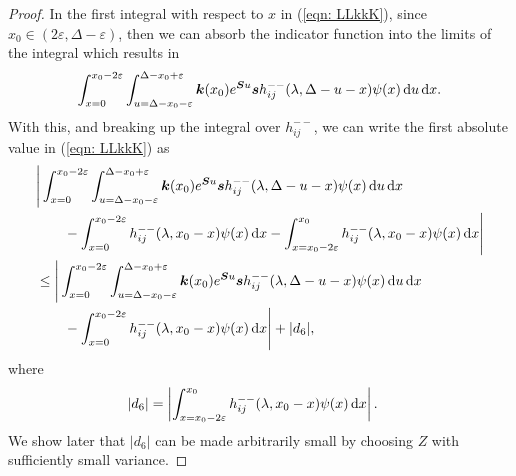 \begin{proof}
	In the first integral with respect to \(x\) in (\ref{eqn: LLkkK}), since \(x_0\in(2\varepsilon,\Delta-\varepsilon)\), then we can absorb the indicator function into the limits of the integral which results in
	\begin{align}
		\int_{x=0}^{x_0-2\varepsilon}\int_{u=\Delta-x_0-\varepsilon}^{\Delta-x_0+\varepsilon} \boldsymbol k(x_0)e^{\boldsymbol Su}\boldsymbol s h_{ij}^{--}(\lambda, \Delta - u - x) \psi(x) \, \mathrm{d} u \, \mathrm{d} x.
	\end{align}
	With this, and breaking up the integral over \(h_{ij}^{--}\), we can write the first absolute value in (\ref{eqn: LLkkK}) as 
	\begin{align}
		\nonumber &\Bigg| \int_{x=0}^{x_0-2\varepsilon}\int_{u=\Delta-x_0-\varepsilon}^{\Delta-x_0+\varepsilon} \boldsymbol k(x_0)e^{\boldsymbol Su}\boldsymbol s h_{ij}^{--}(\lambda, \Delta - u - x) \psi(x) \, \mathrm{d} u  \, \mathrm{d} x 
		\\\nonumber &\qquad{} - \int_{x=0}^{x_0-2\varepsilon} h_{ij}^{--}(\lambda, x_0 - x)\psi(x)\, \mathrm{d} x  - \int_{x=x_0-2\varepsilon}^{x_0} h_{ij}^{--}(\lambda, x_0 - x)\psi(x)\, \mathrm{d} x \Bigg| 
		\\\nonumber &\leq \Bigg| \int_{x=0}^{x_0-2\varepsilon}\int_{u=\Delta-x_0-\varepsilon}^{\Delta-x_0+\varepsilon} \boldsymbol k(x_0)e^{\boldsymbol Su}\boldsymbol s h_{ij}^{--}(\lambda, \Delta - u - x) \psi(x) \, \mathrm{d} u   \, \mathrm{d} x 
		\\&\qquad{} - \int_{x=0}^{x_0-2\varepsilon} h_{ij}^{--}(\lambda, x_0 - x)\psi(x)\, \mathrm{d} x \Bigg| + |d_6|,\label{eqn:PPPPPP}
	\end{align}
		where
	\begin{align}
		&|d_6|=\left|\int_{x=x_0-2\varepsilon}^{x_0} h_{ij}^{--}(\lambda, x_0 - x)\psi(x)\, \mathrm{d} x \right|.\nonumber 
	\end{align}
	We show later that \(|d_6|\) can be made arbitrarily small by choosing \(Z\) with sufficiently small variance.


\end{proof}

